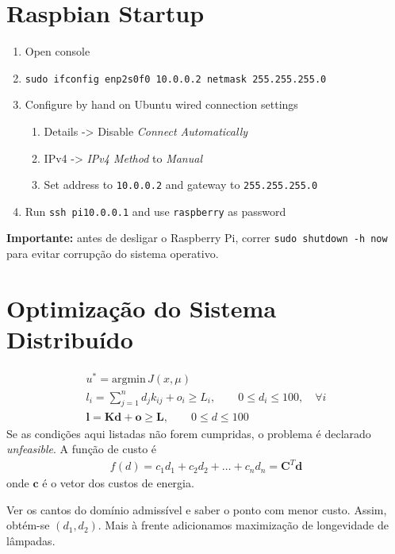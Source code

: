 \documentclass{article}
\newcommand{\matr}[1]{\mathbf{#1}}
\begin{document}
\section{Raspbian Startup}
\begin{enumerate}
	\item Open console
	\item \texttt{sudo ifconfig enp2s0f0 10.0.0.2 netmask 255.255.255.0}
	\item Configure by hand on Ubuntu wired connection settings
	\begin{enumerate}
		\item Details -> Disable \textit{Connect Automatically}
		\item IPv4 -> \textit{IPv4 Method} to \textit{Manual}
		\item Set address to \texttt{10.0.0.2} and gateway to \texttt{255.255.255.0}
	\end{enumerate}
	\item Run \texttt{ssh pi\@10.0.0.1} and use \texttt{raspberry} as password
\end{enumerate}

\textbf{Importante:} antes de desligar o Raspberry Pi, correr \texttt{sudo shutdown -h now} para evitar corrupção do sistema operativo.

\section{Optimização do Sistema Distribuído}

\begin{gather*}
	u^* = \textrm{argmin}\,J(x, \mu) \\
	l_i = \sum^n_{j=1} d_j k_{ij} + o_i \geq L_i, \qquad 0 \leq d_i \leq 100, \quad \forall i \\
	\matr{l} = \matr{K}\matr{d} + \matr{o} \geq \matr{L}, \qquad 0 \leq d \leq 100
\end{gather*}
Se as condições aqui listadas não forem cumpridas, o problema é declarado \textit{unfeasible}. A função de custo é
\begin{gather*}
	f(d) = c_1d_1 + c_2d_2 + \ldots + c_nd_n = \matr{C}^T\matr{d}
\end{gather*}
onde $\matr{c}$ é o vetor dos custos de energia.

Ver os cantos do domínio admissível e saber o ponto com menor custo. Assim, obtém-se $(d_1,d_2)$. Mais à frente adicionamos maximização de longevidade de lâmpadas.
\begin{figure}[ht]
	\centering
\end{figure}
\end{document}
